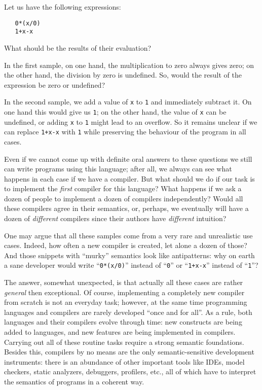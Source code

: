 Let us have the following expressions:

\begin{lstlisting}
   0*(x/0)
   1+x-x
\end{lstlisting}

What should be the results of their evaluation?

In the first sample, on one hand, the multiplication to zero always gives zero; on the other hand, the division by zero is undefined. So, would the result of
the expression be zero or undefined?

In the second sample, we add a value of \lstinline|x| to \lstinline|1| and immediately subtract it. On one hand this would give us \lstinline|1|; on the
other hand, the value of \lstinline|x| can be undefined, or adding \lstinline|x| to \lstinline|1| might lead to an overflow. So it remains unclear if we
can replace \lstinline|1+x-x| with \lstinline|1| while preserving the behaviour of the program in all cases.

Even if we cannot come up with definite oral answers to these questions we still can write programs using this language; after all, we always can
see what happens in each case if we have a compiler. But what should we do if our task is to implement the \emph{first} compiler for this language?
What happens if we ask a dozen of people to implement a dozen of compilers independently? Would all these compilers agree in their semantics, or, perhaps, we
eventually will have a dozen of \emph{different} compilers since their authors have \emph{different} intuition?

One may argue that all these samples come from a very rare and unrealistic use cases. Indeed, how often a new compiler is created, let alone a
dozen of those? And those snippets with ``murky'' semantics look like antipatterns: why on earth a sane developer would write ``\lstinline|0*(x/0)|''
instead of ``\lstinline|0|'' or ``\lstinline|1+x-x|'' instead of ``\lstinline|1|''?

The answer, somewhat unexpected, is that actually all these cases are rather \emph{general} then exceptional. Of course, implementing a completely new compiler from scratch is not an
everyday task; however, at the same time programming languages and compilers are rarely developed ``once and for all''. As a rule, both languages
and their compilers evolve through time: new constructs are being added to languages, and new features are being implemented in compilers. Carrying out all of
these routine tasks require a strong semantic foundations. Besides this, compilers by no means are the only semantic-sensitive development instruments:
there is an abundance of other important tools like IDEs, model checkers, static analyzers, debuggers, profilers, etc., all of which have to interpret the
semantics of programs in a coherent way.

